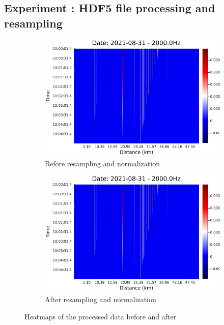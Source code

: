 \subsection{Experiment : HDF5 file processing and resampling}

\begin{figure}[!h]
    \centering
    \begin{subfigure}{0.45\linewidth}
        \centering
        \includegraphics[width=\linewidth]{figures/heatmap_das_test.png}
        \caption{Before resampling and normalization}
        \label{fig:dasoutput1}
    \end{subfigure}
    \hfill
    \begin{subfigure}{0.45\linewidth}
        \centering
        \includegraphics[width=\linewidth]{figures/heatmap_das_test.png}
        \caption{After resampling and normalization}
        \label{fig:dasoutput2}
    \end{subfigure}
    \caption{Heatmaps of the processed data before and after }
    \label{fig:dasoutput}
\end{figure}

